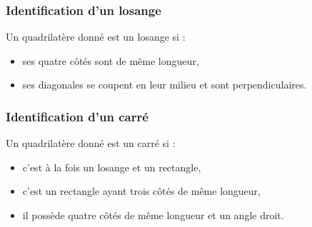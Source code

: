 			\subsubsection{Identification d'un losange}
				Un quadrilat\`ere donn\'e est un losange si :
			\begin{itemize}
					\item ses quatre c\^ot\'es sont de m\^eme longueur,
				\item ses diagonales se coupent en leur milieu et sont perpendiculaires.
			\end{itemize}
			\subsubsection{Identification d'un carr\'e}
			Un quadrilat\`ere donn\'e est un carr\'e si : 
			\begin{itemize}
				\item c'est \`a la fois un losange et un rectangle,
				\item c'est un rectangle ayant trois c\^ot\'es de m\^eme longueur,
				\item il poss\`ede quatre c\^ot\'es de m\^eme longueur et un angle droit.
			\end{itemize}
